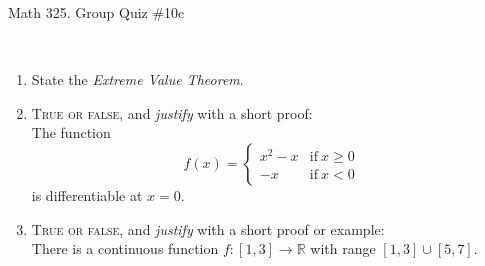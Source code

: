 \documentclass[12pt]{amsart}
\newcommand{\R}{\mathbb{R}}
\begin{document}
	
	\thispagestyle{empty}
	
	\begin{center}
		\Large{Math 325. Group Quiz \#10c }\\

	\end{center}
	
	\
	
\begin{enumerate}
		\item State the \textit{Extreme Value Theorem}. 
		\vfill
		\vfill



\item  \textsc{True or false}, and \emph{justify} with a short proof:\\
 The function 
 \[ f(x) = \begin{cases} x^2 - x & \text{if} \ x\geq 0 \\ -x & \text{if} \ x<0 \end{cases}\]
	is differentiable at $x=0$.
	
	
	\vfill	\vfill\vfill
	

\newpage	
	
\item  \textsc{True or false}, and \emph{justify} with a short proof or example:\\
There is a continuous function $f: [1,3] \to \R$ with range $[1,3] \cup [5,7]$.

\vfill\vfill\vfill





\end{enumerate}


	
\end{document}
